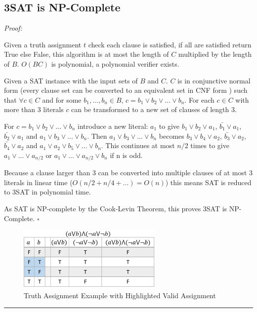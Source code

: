\documentclass[a4paper,11pt]{report}
\begin{document}
\subsection{3SAT is NP-Complete}

\textit{Proof:}

Given a truth assignment $t$ check each clause is satisfied, if all are satisfied return True else False, this algorithm is at most the length of $C$ multiplied by the length of $B$. $O(BC)$ is polynomial, a polynomial verifier exists.

Given a SAT instance with the input sets of $B$ and $C$. $C$ is in conjunctive normal form (every clause set can be converted to an equivalent set in CNF form ) such that $\forall c \in C$ and for some $b_1, ... ,b_n \in B$, $c = b_1 \lor b_2
\lor ... \lor b_n$. For each $c \in C$ with more than 3 literals $c$ can be transformed to a new set of clauses of length 3.

For $c = b_1 \lor b_2 \lor ... \lor b_n$ introduce a new literal: $a_1$ to give $b_1 \lor b_2 \lor a_1$, $\bar{b_1} \lor a_1$, $\bar{b_2} \lor a_1$ and $a_1 \lor b_3 \lor ... \lor b_n$. Then $a_1 \lor b_3 \lor ... \lor b_n$ becomes $b_3 \lor b_4 \lor a_2$, $\bar{b_3} \lor a_2$, $\bar{b_4} \lor a_2$ and $a_1 \lor a_2 \lor b_5 \lor ... \lor b_n$. This continues at most $n/2$ times to give $a_1 \lor ... \lor a_{n/2}$ or $a_1 \lor ... \lor a_{n/2} \lor b_n$ if n is odd.

Because a clause larger than 3 can be converted into multiple clauses of at most 3 literals in linear time ($O(n/2 + n/4 + ...) = O(n)$) this means SAT is reduced to 3SAT in polynomial time.

As SAT is NP-complete by the Cook-Levin Theorem, this proves 3SAT is NP-Complete. $\square$
\begin{figure}
\begin{center}
\includegraphics[width=70mm]{figures/sat_example.png}
\end{center}
\caption{Truth Assignment Example with Highlighted Valid Assignment}
\end{figure}

\noindent\rule{4cm}{0.4pt}
\end{document}
